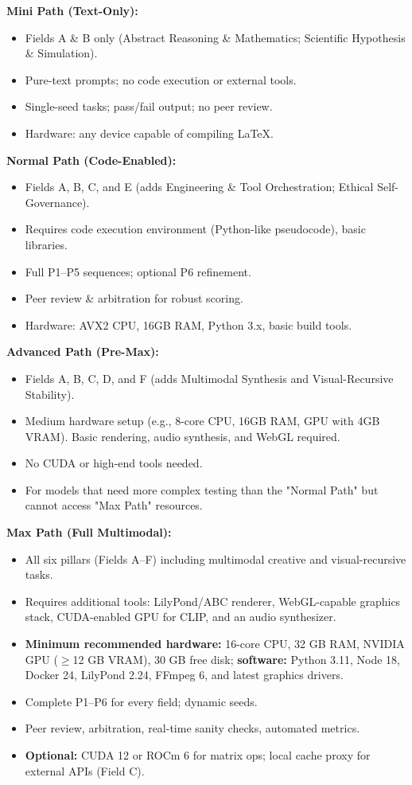\documentclass[11pt]{article}
\begin{document}
\textbf{Mini Path (Text-Only):}
\begin{itemize}
  \item Fields A \& B only (Abstract Reasoning \& Mathematics; Scientific Hypothesis \& Simulation).
  \item Pure-text prompts; no code execution or external tools.
  \item Single-seed tasks; pass/fail output; no peer review.
  \item Hardware: any device capable of compiling \LaTeX{}.
\end{itemize}

\textbf{Normal Path (Code-Enabled):}
\begin{itemize}
  \item Fields A, B, C, and E (adds Engineering \& Tool Orchestration; Ethical Self-Governance).
  \item Requires code execution environment (Python-like pseudocode), basic libraries.
  \item Full P1--P5 sequences; optional P6 refinement.
  \item Peer review \& arbitration for robust scoring.
  \item Hardware: AVX2 CPU, 16GB RAM, Python 3.x, basic build tools.
\end{itemize}

\textbf{Advanced Path (Pre-Max):}
\begin{itemize}
  \item Fields A, B, C, D, and F (adds Multimodal Synthesis and Visual-Recursive Stability).
  \item Medium hardware setup (e.g., 8-core CPU, 16GB RAM, GPU with 4GB VRAM). Basic rendering, audio synthesis, and WebGL required.
  \item No CUDA or high-end tools needed.
  \item For models that need more complex testing than the "Normal Path" but cannot access "Max Path" resources.
\end{itemize}

\textbf{Max Path (Full Multimodal):}
\begin{itemize}
  \item All six pillars (Fields A--F) including multimodal creative and visual-recursive tasks.
  \item Requires additional tools: LilyPond/ABC renderer, WebGL-capable graphics stack, CUDA-enabled GPU for CLIP, and an audio synthesizer.
  \item \textbf{Minimum recommended hardware:} 16-core CPU, 32 GB RAM, NVIDIA GPU (\ensuremath{\geq}12 GB VRAM), 30 GB free disk; \textbf{software:} Python 3.11, Node 18, Docker 24, LilyPond 2.24, FFmpeg 6, and latest graphics drivers.
  \item Complete P1--P6 for every field; dynamic seeds.
  \item Peer review, arbitration, real-time sanity checks, automated metrics.
  \item \textbf{Optional:} CUDA 12 or ROCm 6 for matrix ops; local cache proxy for external APIs (Field C).
\end{itemize}
\end{document}
